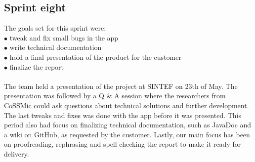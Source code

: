 \subsection{Sprint eight}
The goals set for this sprint were:\\
$\bullet$\hspace{0.25cm} tweak and fix small bugs in the app\\
$\bullet$\hspace{0.25cm} write technical documentation\\
$\bullet$\hspace{0.25cm} hold a final presentation of the product for the customer\\
$\bullet$\hspace{0.25cm} finalize the report\\\\
The team held a presentation of the project at SINTEF on 23th of May. The presentation was followed by a Q \& A session where the researchers from CoSSMic could ask questions about technical solutions and further development. The last tweaks and fixes was done with the app before it was presented. This period also had focus on finalizing technical documentation, such as JavaDoc and a wiki on GitHub, as requested by the customer. Lastly, our main focus has been on proofreading, rephrasing and spell checking the report to make it ready for delivery.
